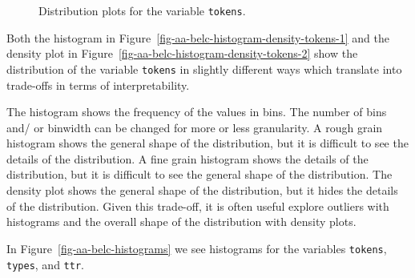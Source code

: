 \documentclass[
  letterpaper,
  DIV=11,
  numbers=noendperiod]{scrreport}
\theoremstyle{definition}
\theoremstyle{remark}
\begin{document}
\begin{figure}

\begin{minipage}[t]{0.50\linewidth}

{\centering 


}

\end{minipage}%
%
\begin{minipage}[t]{0.50\linewidth}

{\centering 


}

\end{minipage}%

\caption{\label{fig-aa-belc-histogram-density-tokens}Distribution plots
for the variable \texttt{tokens}.}

\end{figure}

Both the histogram in
Figure~\ref{fig-aa-belc-histogram-density-tokens-1} and the density plot
in Figure~\ref{fig-aa-belc-histogram-density-tokens-2} show the
distribution of the variable \texttt{tokens} in slightly different ways
which translate into trade-offs in terms of interpretability.

The histogram shows the frequency of the values in bins. The number of
bins and/ or binwidth can be changed for more or less granularity. A
rough grain histogram shows the general shape of the distribution, but
it is difficult to see the details of the distribution. A fine grain
histogram shows the details of the distribution, but it is difficult to
see the general shape of the distribution. The density plot shows the
general shape of the distribution, but it hides the details of the
distribution. Given this trade-off, it is often useful explore outliers
with histograms and the overall shape of the distribution with density
plots.

In Figure~\ref{fig-aa-belc-histograms} we see histograms for the
variables \texttt{tokens}, \texttt{types}, and \texttt{ttr}.
\end{document}
